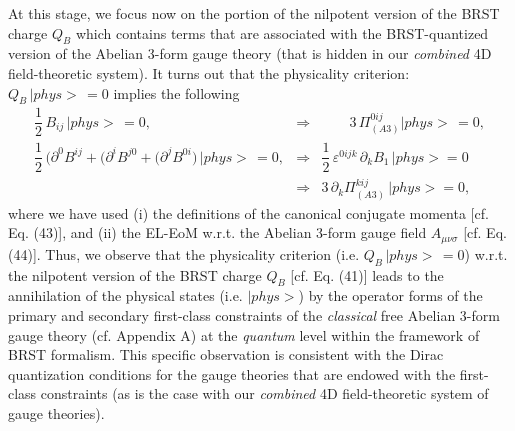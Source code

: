 \documentclass[12pt]{article}
\begin{document}
At this stage, we focus now on the portion of the nilpotent version of the BRST charge $Q_B$ which contains terms that are 
associated with the BRST-quantized
version of the Abelian 3-form gauge theory (that is hidden in our {\it combined} 4D field-theoretic system). It turns out that the physicality
criterion: $Q_B \, |phys> \,= 0$ implies the following
\begin{eqnarray}\label{46}
\dfrac{1}{2}\, B_{ij} \, |phys> \,= 0, \qquad &\Longrightarrow& \qquad  3\,\Pi^{0ij}_{(A3)} |phys>\, = 0, \nonumber\\
\dfrac{1}{2}\, \big (\partial^0 B^{ij} + (\partial^i B^{j0}  + (\partial^j B^{0i}  \big ) \, |phys> \, = 0, 
&\Longrightarrow& \dfrac{1}{2}\, \varepsilon^{0ijk}\, \partial_k B_1 \,|phys> = 0 \nonumber\\
 &\Longrightarrow& 3\,\partial_k \Pi^{kij}_{(A3)} \, |phys> = 0,
\end{eqnarray}
where we have used (i) the definitions of the canonical conjugate momenta [cf. Eq. (43)], and (ii) the EL-EoM w.r.t. the Abelian 3-form
gauge field $A_{\mu\nu\sigma}$ [cf. Eq. (44)]. Thus, we observe that the physicality criterion (i.e. $Q_B \, |phys>\, = 0$) w.r.t. the
nilpotent version of the BRST charge $Q_B$ [cf. Eq. (41)] leads to the annihilation of the physical states (i.e. $|phys>$) by the
operator forms of the primary and secondary first-class constraints of the {\it classical} free Abelian 3-form gauge theory
(cf. Appendix A) at the {\it quantum} level within the framework of BRST formalism. This specific observation is consistent
with the Dirac quantization conditions for the gauge theories that are endowed with the first-class constraints
(as is the case with our {\it combined} 4D field-theoretic system of gauge theories).
\end{document}
